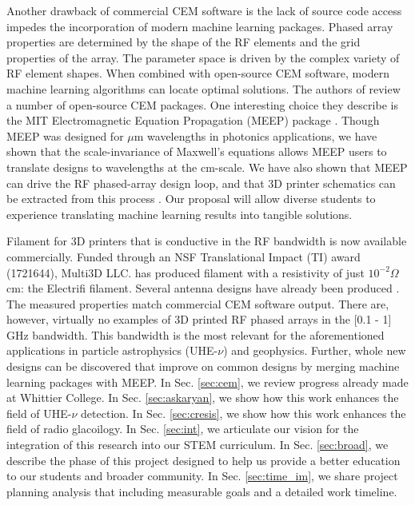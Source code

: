 \documentclass[../../main.tex]{subfiles}
\begin{document}
Another drawback of commercial CEM software is the lack of source code access impedes the incorporation of modern machine learning packages.  Phased array properties are determined by the shape of the RF elements and the grid properties of the array.  The parameter space is driven by the complex variety of RF element shapes.  When combined with open-source CEM software, modern machine learning algorithms can locate optimal solutions.  The authors of \cite{10.3390/electronics8121506} review a number of open-source CEM packages.  One interesting choice they describe is the MIT Electromagnetic Equation Propagation (MEEP) package \cite{10.1016/j.cpc.2009.11.008}.  Though MEEP was designed for $\mu$m wavelengths in photonics applications, we have shown that the scale-invariance of Maxwell's equations allows MEEP users to translate designs to wavelengths at the cm-scale.  We have also shown that MEEP can drive the RF phased-array design loop, and that 3D printer schematics can be extracted from this process \cite{electronics10040415,meepcon2022,10.1016/j.cpc.2009.11.008}.  Our proposal will allow diverse students to experience translating machine learning results into tangible solutions.  \\ \vspace{2.5mm}

Filament for 3D printers that is conductive in the RF bandwidth is now available commercially.  Funded through an NSF Translational Impact (TI) award (1721644), Multi3D LLC. has produced filament with a resistivity of just $10^{-2} \Omega$ cm: the Electrifi filament.  Several antenna designs have already been produced \cite{8786183,10.1049/iet-map.2017.0104}.  The measured properties match commercial CEM software output.  There are, however, virtually no examples of 3D printed RF phased arrays in the [0.1 - 1] GHz bandwidth.  This bandwidth is the most relevant for the aforementioned applications in particle astrophysics (UHE-$\nu$) and geophysics.  Further, whole new designs can be discovered that improve on common designs by merging machine learning packages with MEEP.  In Sec. \ref{sec:cem}, we review progress already made at Whittier College.  In Sec. \ref{sec:askaryan}, we show how this work enhances the field of UHE-$\nu$ detection.  In Sec. \ref{sec:cresis}, we show how this work enhances the field of radio glacoilogy.  In Sec. \ref{sec:int}, we articulate our vision for the integration of this research into our STEM curriculum.  In Sec. \ref{sec:broad}, we describe the phase of this project designed to help us provide a better education to our students and broader community.  In Sec. \ref{sec:time_im}, we share project planning analysis that including measurable goals and a detailed work timeline.
\end{document}
